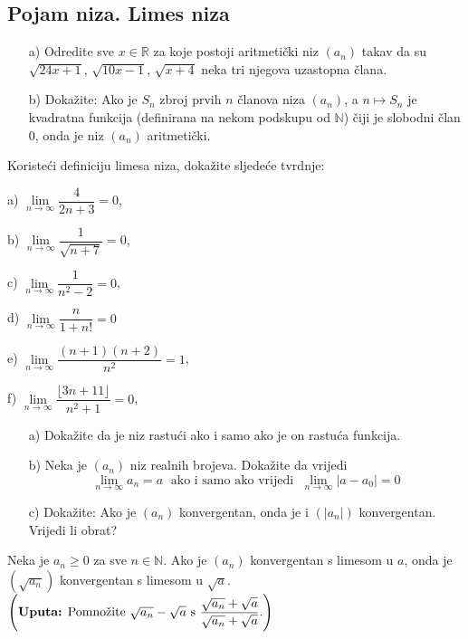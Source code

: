 \subsection*{Pojam niza. Limes niza}
\begin{exercise}\textbf{}
\begin{itemize}
\item[a)] Odredite sve $x\in \mathbb{R}$ za koje postoji aritmetički niz $(a_n)$ takav da su $\sqrt{24x+1}$, $\sqrt{10x-1}$, $\sqrt{x+4}$ neka tri njegova uzastopna člana.
\item[b)] Dokažite: Ako je $S_n$ zbroj prvih $n$ članova niza $(a_n)$, a $n\mapsto S_n$ je kvadratna funkcija (definirana na nekom podskupu od $\mathbb{N}$) čiji je slobodni član $0$, onda je niz $(a_n)$ aritmetički.
\end{itemize}
\end{exercise}
\begin{exercise}
Koristeći definiciju limesa niza, dokažite sljedeće tvrdnje:
\begin{AutoMultiColItemize}
\item[a)] $\lim\limits_{n\to \infty}{\dfrac{4}{2n+3}}=0$,
\item[b)] $\lim\limits_{n\to \infty}{\dfrac{1}{\sqrt{n+7}}}=0$,
\item[c)] $\lim\limits_{n\to \infty}{\dfrac{1}{n^2-2}}=0$,
\item[d)] $\lim\limits_{n\to\infty}{\dfrac{n}{1+n!}}=0$
\item[e)] $\lim\limits_{n\to \infty}{\dfrac{(n+1)(n+2)}{n^2}}=1$,
\item[f)] $\lim\limits_{n\to \infty}{\dfrac{\lfloor 3n+11\rfloor}{n^2+1}}=0$,
\end{AutoMultiColItemize}
\end{exercise}
\begin{exercise} 
\label{seqfunex}
\textbf{}
\begin{itemize}
\item[a)] Dokažite da je niz rastući ako i samo ako je on rastuća funkcija.
\item[b)] Neka je $(a_n)$ niz realnih brojeva. Dokažite da vrijedi $$\lim\limits_{n\to \infty}{a_n}=a\;\text{ ako i samo ako vrijedi }\;\lim\limits_{n\to \infty}{|a-a_0|}=0$$
\item[c)] Dokažite: Ako je $(a_n)$ konvergentan, onda je i $(|a_n|)$ konvergentan. Vrijedi li obrat?
\end{itemize}
\end{exercise}
Neka je $a_n\geq 0$ za sve $n\in \mathbb{N}$. Ako je $(a_n)$ konvergentan s limesom u $a$, onda je $(\sqrt{a_n})$ konvergentan s limesom u $\sqrt{a}$. $\left(\text{\textbf{Uputa:} Pomnožite }\sqrt{a_n}-\sqrt{a}\text{ s }\dfrac{\sqrt{a_n}+\sqrt{a}}{\sqrt{a_n}+\sqrt{a}}.\right)$
